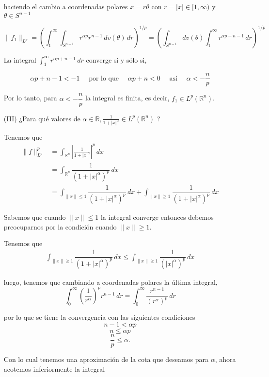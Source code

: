 \begin{itemize}
\begin{sol}
haciendo el cambio a coordenadas polares \( x = r\theta \) con \( r = |x| \in [1, \infty) \) y \( \theta \in S^{n-1} \)

\[\| f_1 \|_{L^p} =\left( \int_1^\infty \int_{S^{n-1}} r^{\alpha p} r^{n-1} \, dv(\theta) \, dr \right)^{1/p} = \left( \int_{S^{n-1}} dv(\theta) \int_1^\infty r^{\alpha p + n - 1} \, dr \right)^{1/p}
\]

La integral \( \int_1^\infty r^{\alpha p + n - 1} \, dr \) converge si y sólo si,

\[
\alpha p + n - 1 < -1 \quad \text{ por lo que } \quad \alpha p + n < 0 \quad \text{ así }\quad \alpha < -\frac{n}{p}
\]

Por lo tanto, para \( \alpha < -\dfrac{n}{p} \) la integral es finita, es decir, \( f_1 \in L^p(\mathbb{R}^n) \).
\end{sol}

\item[(III)] ¿Para qué valores de $\alpha \in \mathbb{R}, \frac{1}{1+|x|^\alpha} \in L^p\left(\mathbb{R}^n\right)$ ?
\begin{sol}
Tenemos que 
\begin{align*}
  \| f \|_{L^p}^{p} &= \int_{\mathbb{R}^n} \left|\frac{1}{1 + |x|^\alpha}\right|^{p}\, dx \\
   &= \int_{\mathbb{R}^n} \dfrac{1}{(1 + |x|^\alpha)^p} \, dx \\
   &= \int_{\|x\|\leq 1} \dfrac{1}{(1 + |x|^\alpha)^p} \, dx + \int_{\|x\|\geq 1} \dfrac{1}{(1 + |x|^\alpha)^p} \, dx
\end{align*}

Sabemos que cuando $\|x\|\leq 1$ la integral converge entonces debemos preocuparnos por la condición cuando $\|x\| \geq 1$.

Tenemos que 
\begin{align*}
  \int_{\|x\|\geq 1} \dfrac{1}{(1 + |x|^\alpha)^p} \, dx \leq  \int_{\|x\|\geq 1} \dfrac{1}{(|x|^\alpha)^p} \, dx
\end{align*}

luego, tenemos que cambiando a coordenadas polares la última integral,
\[ 
 \int_{0}^{\infty} \left( \frac{1}{r^{\alpha}} \right)^{p} r^{n-1} \, dr = \int_{0}^{\infty} \frac{r^{n-1}}{(r^{\alpha})^{p}} \, dr 
\]

por lo que se tiene la convergencia con las siguientes condiciones
\[ 
n - 1 < \alpha p 
\]
\[ 
n \leq \alpha p 
\]
\[ 
\frac{n}{p} \leq \alpha. 
\]

Con lo cual tenemos una aproximación de la cota que deseamos para $\alpha$, ahora acotemos inferiormente la integral


\end{sol}
\end{itemize}

